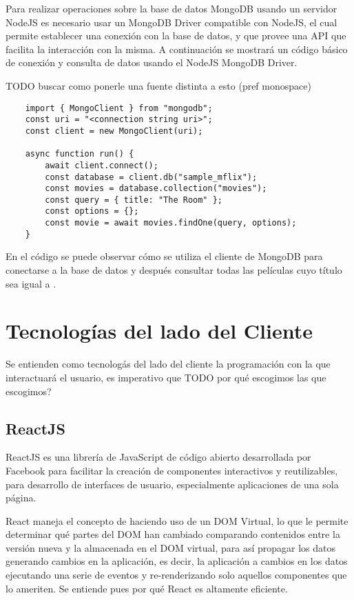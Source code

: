 Para realizar operaciones sobre la base de datos MongoDB usando un servidor NodeJS es necesario usar un MongoDB Driver compatible con NodeJS, el cual permite establecer una conexión con la base de datos, y que provee una API que facilita la interacción con la misma. A continuación se mostrará un código básico de conexión y consulta de datos usando el NodeJS MongoDB Driver.

TODO buscar como ponerle una fuente distinta a esto (pref monospace)
\begin{lstlisting}
    import { MongoClient } from "mongodb";
    const uri = "<connection string uri>";
    const client = new MongoClient(uri);

    async function run() {
        await client.connect();
        const database = client.db("sample_mflix");
        const movies = database.collection("movies");
        const query = { title: "The Room" };
        const options = {};
        const movie = await movies.findOne(query, options);
    }
\end{lstlisting}

En el código se puede observar cómo se utiliza el cliente de MongoDB para conectarse a la base de datos  y después consultar todas las películas cuyo título sea igual a .

\section{Tecnologías del lado del Cliente}

Se entienden como tecnologás del lado del cliente la programación con la que interactuará el usuario, es imperativo que 
TODO por qué escogimos las que escogimos?

\subsection{ReactJS}

ReactJS es una librería de JavaScript de código abierto desarrollada por Facebook para facilitar la creación de componentes interactivos y reutilizables, para desarrollo de interfaces de usuario, especialmente aplicaciones de una sola página.

React maneja el concepto de  \cite{ReactiveProgramming} haciendo uso de un DOM Virtual, lo que le permite determinar qué partes del DOM han cambiado comparando contenidos entre la versión nueva y la almacenada en el DOM virtual, para así propagar los datos generando cambios en la aplicación, es decir, la aplicación  a cambios en los datos ejecutando una serie de eventos y re-renderizando solo aquellos componentes que lo ameriten. Se entiende pues por qué React es altamente eficiente. 

